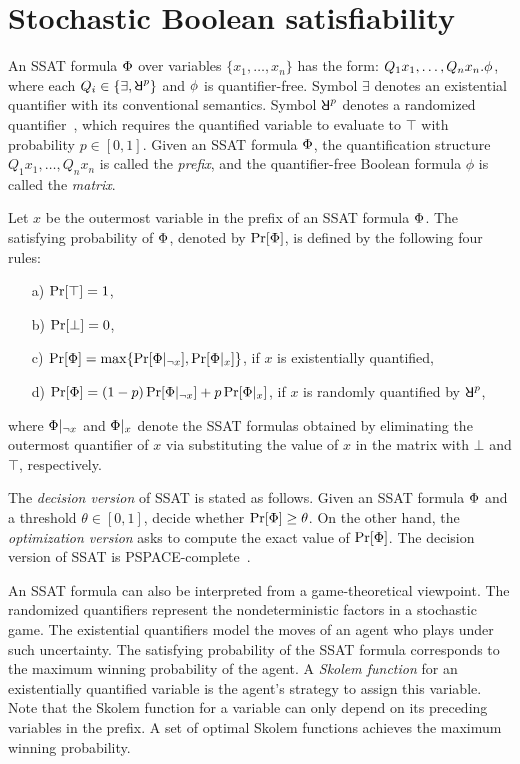 \section{Stochastic Boolean satisfiability}
\label{sect:background-ssat}

An SSAT formula $\Phi$ over variables $\{x_1,\ldots,x_n\}$ has the form:
$Q_1x_1,\ldots,Q_nx_n.\phi$,
where each $Q_i\in\{\exists,\random{p}\}$ and $\phi$ is quantifier-free.
Symbol $\exists$ denotes an existential quantifier with its conventional semantics.
Symbol $\random{p}$ denotes a randomized quantifier~\cite{Papadimitriou1985}, which requires
the quantified variable to evaluate to $\top$ with probability $p\in[0,1]$.
Given an SSAT formula $\Phi$, the quantification structure $Q_1 x_1, \ldots, Q_n x_n$ is called the \emph{prefix},
and the quantifier-free Boolean formula $\phi$ is called the \emph{matrix}.

Let $x$ be the outermost variable in the prefix of an SSAT formula $\Phi$.
The satisfying probability of $\Phi$, denoted by $\Pr[\Phi]$, is defined by the following four rules:
\begin{enumerate}
    \item[a)] $\Pr[\top]=1$,
    \item[b)] $\Pr[\bot]=0$,
    \item[c)] $\Pr[\Phi]=\max\{\Pr[\Phi|_{\lnot x}],\Pr[\Phi|_{x}]\}$, if $x$ is existentially quantified,
    \item[d)] $\Pr[\Phi]=(1-p)\Pr[\Phi|_{\lnot x}]+p\Pr[\Phi|_{x}]$, if $x$ is randomly quantified by $\random{p}$,
\end{enumerate}
where $\Phi|_{\lnot x}$ and $\Phi|_{x}$ denote the SSAT formulas obtained by eliminating the outermost quantifier of $x$ via substituting the value of $x$ in the matrix with $\bot$ and $\top$, respectively.

The \textit{decision version} of SSAT is stated as follows.
Given an SSAT formula $\Phi$ and a threshold $\theta\in[0,1]$, decide whether $\Pr[\Phi]\geq\theta$.
On the other hand, the \textit{optimization version} asks to compute the exact value of $\Pr[\Phi]$.
The decision version of SSAT is PSPACE-complete~\cite{Papadimitriou1985}.

An SSAT formula can also be interpreted from a game-theoretical viewpoint.
The randomized quantifiers represent the nondeterministic factors in a stochastic game.
The existential quantifiers model the moves of an agent who plays under such uncertainty.
The satisfying probability of the SSAT formula corresponds to the maximum winning probability of the agent.
A \textit{Skolem function} for an existentially quantified variable is the agent's strategy to assign this variable.
Note that the Skolem function for a variable can only depend on its preceding variables in the prefix.
A set of optimal Skolem functions achieves the maximum winning probability.

